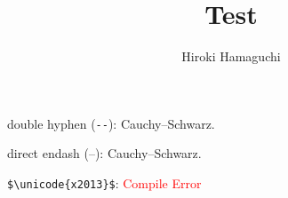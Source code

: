 \documentclass[11pt]{article}
\begin{document}
\title{Test}

\author{Hiroki Hamaguchi}
\date{}

\maketitle

double hyphen (\verb|--|): Cauchy--Schwarz.

direct endash (–): Cauchy–Schwarz.

\verb|$\unicode{x2013}$|: \textcolor{red}{Compile Error}
\end{document}
